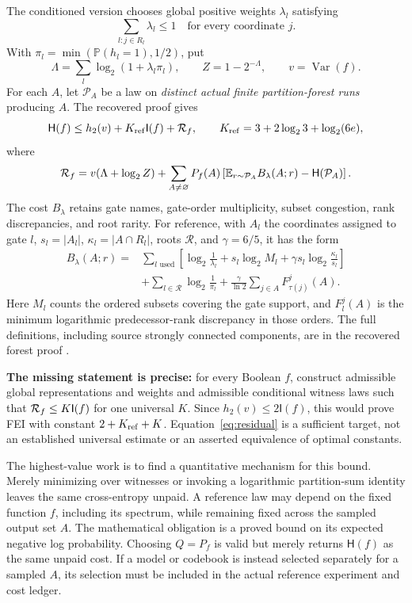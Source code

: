 \documentclass[11pt]{article}
\newcommand{\HH}{\mathsf H}\newcommand{\I}{\mathsf I}
\newcommand{\E}{\mathbb E}\newcommand{\Pp}{\mathbb P}
\newcommand{\Var}{\operatorname{Var}}\newcommand{\wh}[1]{\widehat{#1}}
\begin{document}
The conditioned version chooses global positive weights $\lambda_l$ satisfying
\[
 \sum_{l:j\in R_l}\lambda_l\le1\quad\text{for every coordinate }j.
\]
With $\pi_l=\min(\Pp(h_l=1),1/2)$, put
\[
 \Lambda=\sum_l\log_2(1+\lambda_l\pi_l),\qquad
 Z=1-2^{-\Lambda},\qquad v=\Var(f).
\]
For each $A$, let $\mathcal P_A$ be a law on \emph{distinct actual finite partition-forest runs} producing $A$. The recovered proof gives
\begin{equation}\label{eq:forest}
 \HH(f)\le h_2(v)+K_{\rm ref}\I(f)+\Rcost,
 \qquad K_{\rm ref}=3+2\log_2 3+\log_2(6e),
\end{equation}
where
\begin{equation}\label{eq:residual}
 \Rcost=v(\Lambda+\log_2 Z)+
 \sum_{A\ne\varnothing}P_f(A)
 \left[\E_{r\sim\mathcal P_A}B_\lambda(A;r)-\HH(\mathcal P_A)\right].
\end{equation}
The cost $B_\lambda$ retains gate names, gate-order multiplicity, subset congestion, rank discrepancies, and root rarity. For reference, with $A_l$ the coordinates assigned to gate $l$, $s_l=|A_l|$, $\kappa_l=|A\cap R_l|$, roots $\mathcal R$, and $\gamma=6/5$, it has the form
\begin{align*}
 B_\lambda(A;r)={}&\sum_{l\text{ used}}\left[
 \log_2\frac1{\lambda_l}+s_l\log_2 M_l
 +\gamma s_l\log_2\frac{\kappa_l}{s_l}\right]\\
 &+\sum_{l\in\mathcal R}\log_2\frac1{\pi_l}
 +\frac{\gamma}{\ln2}\sum_{j\in A}F_{\tau(j)}^j(A).
\end{align*}
Here $M_l$ counts the ordered subsets covering the gate support, and $F_l^j(A)$ is the minimum logarithmic predecessor-rank discrepancy in those orders. The full definitions, including source strongly connected components, are in the recovered forest proof \cite{Reductions}.

\textbf{The missing statement is precise:} for every Boolean $f$, construct admissible global representations and weights and admissible conditional witness laws such that $\Rcost\le K\I(f)$ for one universal $K$. Since $h_2(v)\le2\I(f)$, this would prove FEI with constant $2+K_{\rm ref}+K$. Equation~\eqref{eq:residual} is a sufficient target, not an established universal estimate or an asserted equivalence of optimal constants.

The highest-value work is to find a quantitative mechanism for this bound. Merely minimizing over witnesses or invoking a logarithmic partition-sum identity leaves the same cross-entropy unpaid. A reference law may depend on the fixed function $f$, including
its spectrum, while remaining fixed across the sampled output
set $A$. The mathematical obligation is a proved bound on its
expected negative log probability. Choosing $Q=P_f$ is valid
but merely returns $\HH(f)$ as the same unpaid cost. If a
model or codebook is instead selected separately for a sampled
$A$, its selection must be included in the actual reference
experiment and cost ledger.
\end{document}

